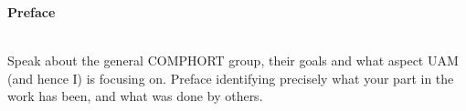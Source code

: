 \begin{center}
    \Large{\textbf{Preface}} \\
\end{center}
~\\[0.5 cm]

Speak about the general COMPHORT group, their goals and what aspect UAM (and hence I) is focusing on.
Preface identifying precisely what your part in the work has been, and what was done by others. 

\newpage